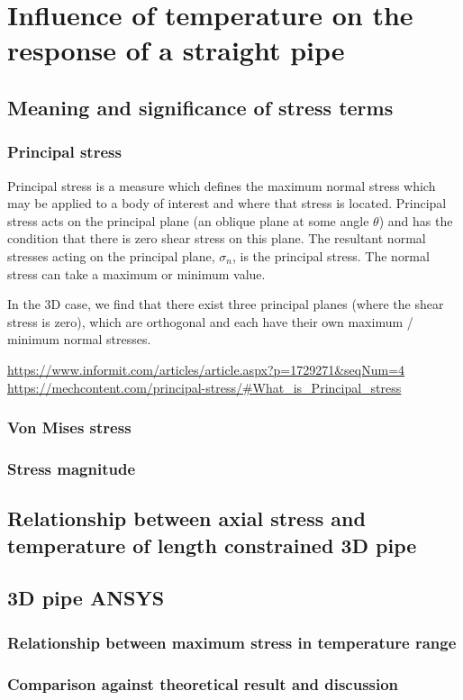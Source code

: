 \section{Influence of temperature on the response of a straight pipe}
\subsection{Meaning and significance of stress terms}
\subsubsection{Principal stress}
Principal stress is a measure which defines the maximum normal stress which may be applied to a body of interest and where that stress is located. Principal stress acts on the principal plane (an oblique plane at some angle $\theta$) and has the condition that there is zero shear stress on this plane. The resultant normal stresses acting on the principal plane, $\sigma_n$, is the principal stress. The normal stress can take a maximum or minimum value.

In the 3D case, we find that there exist three principal planes (where the shear stress is zero), which are orthogonal and each have their own maximum / minimum normal stresses. 

\url{https://www.informit.com/articles/article.aspx?p=1729271&seqNum=4}
\url{https://mechcontent.com/principal-stress/#What_is_Principal_stress}
\subsubsection{Von Mises stress}
\subsubsection{Stress magnitude}
\subsection{Relationship between axial stress and temperature of length constrained 3D pipe}\label{part1b}
\subsection{3D pipe ANSYS}\label{part1c}
\subsubsection{Relationship between maximum stress in temperature range}
\subsubsection{Comparison against theoretical result and discussion}
